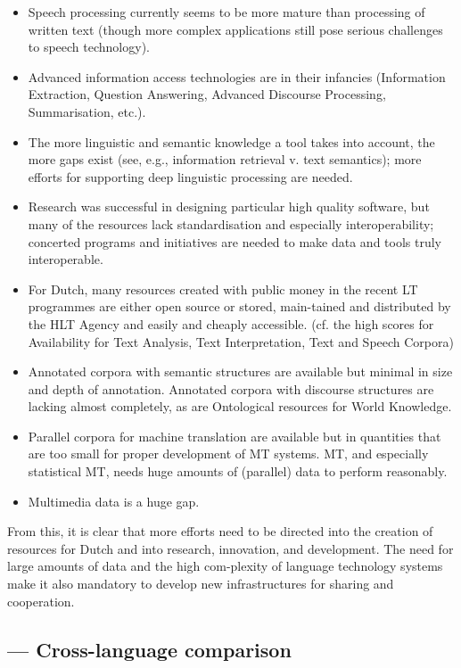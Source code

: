 \documentclass{scrartcl}
\begin{document}
\begin{Parallel}[c]{70mm}{70mm}
{\begin{itemize}
 \item Speech processing currently seems to be more mature than processing of written text (though more complex applications still pose serious challenges to speech technology).
 \item Advanced information access technologies are in their infancies (Information Extraction, Question Answering, Advanced Discourse Processing, Summarisation, etc.).
 \item The more linguistic and semantic knowledge a tool takes into account, the more gaps exist (see, e.g., information retrieval v. text semantics); more efforts for supporting deep linguistic processing are needed.
 \item	Research was successful in designing particular high quality software, but many of the resources lack standardisation and especially interoperability; concerted programs and initiatives are needed to make data and tools truly interoperable.
 \item	For Dutch, many resources created with public money in the recent LT programmes are either open source or stored, main-tained and distributed by the HLT Agency and easily and cheaply accessible. (cf. the high scores for Availability for Text Analysis, Text Interpretation, Text and Speech Corpora)
 \item 	Annotated corpora with semantic structures are available but minimal in size and depth of annotation. Annotated corpora with discourse structures are lacking almost completely, as are     Ontological resources for World Knowledge.
\item  	Parallel corpora for machine translation are available but in quantities that are too small for proper development of MT systems. MT, and especially statistical MT, needs huge amounts of (parallel) data to perform reasonably.
\item  	Multimedia data is a huge gap.
\end{itemize}

From this, it is clear that more efforts need to be directed into the creation of resources for Dutch and into research, innovation, and development. The need for large amounts of data and the high com-plexity of language technology systems make it also mandatory to develop new infrastructures for sharing and cooperation.

  }

  \ParallelPar


  \subsection{ --- Cross-language comparison}


\end{Parallel}
\end{document}
